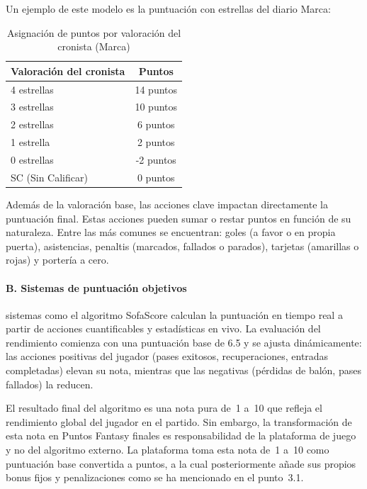 Un ejemplo de este modelo es la puntuación con estrellas del diario Marca:

\begin{table}[h]
\centering
\begin{tabular}{lc}
\toprule
\textbf{Valoración del cronista} & \textbf{Puntos} \\
\midrule
4 estrellas & 14 puntos \\
3 estrellas & 10 puntos \\
2 estrellas & 6 puntos \\
1 estrella & 2 puntos \\
0 estrellas & -2 puntos \\
SC (Sin Calificar) & 0 puntos \\
\bottomrule
\end{tabular}
\caption{Asignación de puntos por valoración del cronista (Marca)}\label{tab:cronista_puntos}
\end{table}

Además de la valoración base, las acciones clave impactan directamente la puntuación final.
Estas acciones pueden sumar o restar puntos en función de su naturaleza.
Entre las más comunes se encuentran: goles (a favor o en propia puerta), asistencias, penaltis 
(marcados, fallados o parados), tarjetas (amarillas o rojas) y portería a cero.

\paragraph{B. Sistemas de puntuación objetivos}

sistemas como el algoritmo SofaScore calculan la puntuación en tiempo real a partir de acciones 
cuantificables y estadísticas en vivo.
La evaluación del rendimiento comienza con una puntuación base de 6.5 y se ajusta dinámicamente: 
las acciones positivas del jugador (pases exitosos, recuperaciones, entradas completadas) elevan su 
nota, mientras que las negativas (pérdidas de balón, pases fallados) la reducen.

El resultado final del algoritmo es una nota pura de~1 a~10 que refleja el rendimiento global del 
jugador en el partido.
Sin embargo, la transformación de esta nota en Puntos Fantasy finales es responsabilidad de la 
plataforma de juego y no del algoritmo externo.
La plataforma toma esta nota de~1 a~10 como puntuación base convertida a puntos, a la cual 
posteriormente añade sus propios bonus fijos y penalizaciones como se ha mencionado en el punto~3.1.

